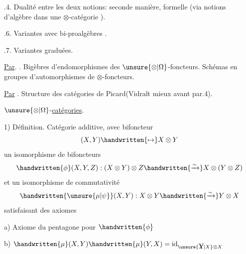 .4. Dualité entre les deux notions: seconde manière, formelle (via  notions d'algèbre dans une $\otimes$-catégorie ).



.6. Variantes avec bi-proalgèbres .

.7. Variantes graduées.

\uline{Par}. . Bigèbres d'endomorphismes des $\unsure{\otimes|\Omega}$-foncteurs. Schémas en groupes d'automorphismes de $\otimes$-foncteurs.


\uline{Par} . Structure des catégories de Picard(Vidra$\mathbb{i}$t mieux avant par.4).





$\unsure{\otimes|\Omega}$-\uline{catégories}.

1) Définition. Catégorie  additive, avec bifoncteur
\[
(X,Y)\handwritten{\mapsto}X\otimes Y
\]
 un  isomorphisme de bifoncteurs
\[
\handwritten{\phi}(X,Y,Z): (X\otimes Y)\otimes Z\handwritten{\xrightarrow{\sim}}X\otimes(Y\otimes Z)
\]
et un isomorphisme de commutativité
\[
\handwritten{\unsure{\mu|\psi}}(X,Y): X\otimes Y\handwritten{\xrightarrow{\sim}}Y\otimes X
\]
satisfaisant des axiomes

a) Axiome du pentagone pour $\handwritten{\phi}$ 

b) $\handwritten{\mu}(X,Y)\handwritten{\mu}(Y,X)=\mathrm{id}_{\unsure{\rlap{Y}X|X}\otimes X}$ \handwritten{;}

